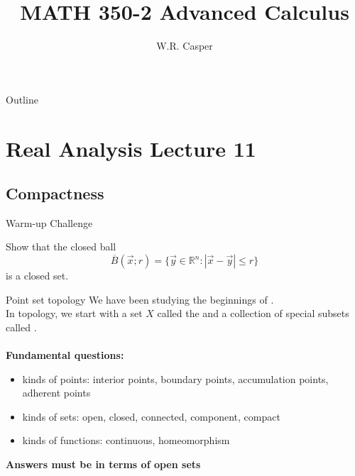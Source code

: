 \documentclass{beamer}
\title{MATH 350-2 Advanced Calculus}
\subtitle
{} %
\author[W.R. Casper] %
{W.R. Casper}
\institute[California State University Fullerton] %
{
  Department of Mathematics\\
  California State University Fullerton}
\begin{document}
\begin{frame}
  \titlepage
\end{frame}

\begin{frame}{Outline}
  \tableofcontents
\end{frame}



\section{Real Analysis Lecture 11}
\subsection{Compactness}

\begin{frame}{Warm-up Challenge}
\begin{prob}
Show that the closed ball
$$\overline B(\vec x; r) = \{\vec y\in \mathbb{R}^n: |\vec x-\vec y| \leq r\}$$
is a closed set.
\end{prob}
\end{frame}

\begin{frame}{Point set topology}
We have been studying the beginnings of .\\
\pause
In topology, we start with a set $X$ called the  and a collection of special subsets called .\\\mbox{}\\
\pause
\textbf{Fundamental questions:}
\begin{itemize}
\pause
\item kinds of points: interior points, boundary points, accumulation points, adherent points
\pause
\item kinds of sets: open, closed, connected, component, compact
\pause
\item kinds of functions: continuous, homeomorphism
\end{itemize}
\pause
{\color{red}\textbf{Answers must be in terms of open sets}}
\end{frame}
\end{document}
